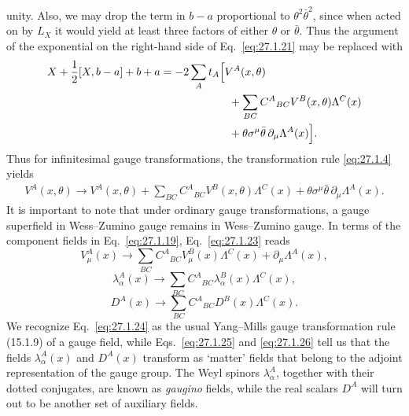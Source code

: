 unity. Also, we may drop the term in \(b-a\) proportional to
\(\theta^2\bar\theta^2\), since when acted on by \(L_X\) it would
yield at least three factors of either \(\theta\) or \(\bar\theta\). Thus
the argument of the exponential on the right-hand side of
Eq.~\eqref{eq:27.1.21} may be replaced with
\[
  \begin{aligned}
  X+\frac12[X,b-a]+b+a
  &=-2\sum_A t_A\Bigl[V^A(x,\theta)
  \\
  &\hspace{22mm}
    +\sum_{BC}C^A{}_{BC}V^B(x,\theta)\Lambda^C(x)
  \\
  &\hspace{22mm}
    +\theta\sigma^\mu\bar\theta\,
      \partial_\mu\Lambda^A(x)\Bigr].
  \end{aligned}
\]
Thus for infinitesimal gauge transformations, the transformation rule
\eqref{eq:27.1.4} yields
\begin{equation}
  \begin{split}
  V^A(x,\theta)\longrightarrow
  V^A(x,\theta)
  +\sum_{BC}C^A{}_{BC}V^B(x,\theta)\Lambda^C(x)
  +\theta\sigma^\mu\bar\theta\,\partial_\mu\Lambda^A(x).
  \end{split}
  \tag{27.1.23}\label{eq:27.1.23}
\end{equation}
It is important to note that under ordinary gauge transformations, a gauge
superfield in Wess--Zumino gauge remains in Wess--Zumino gauge. In terms of
the component fields in Eq.~\eqref{eq:27.1.19},
Eq.~\eqref{eq:27.1.23} reads
\begin{equation}
  V^A_\mu(x)\longrightarrow
  \sum_{BC}C^A{}_{BC}V^B_\mu(x)\Lambda^C(x)
  +\partial_\mu\Lambda^A(x),
  \tag{27.1.24}\label{eq:27.1.24}
\end{equation}
\begin{equation}
  \lambda^A_\alpha(x)\longrightarrow
  \sum_{BC}C^A{}_{BC}\lambda^B_\alpha(x)\Lambda^C(x),
  \tag{27.1.25}\label{eq:27.1.25}
\end{equation}
\begin{equation}
  D^A(x)\longrightarrow
  \sum_{BC}C^A{}_{BC}D^B(x)\Lambda^C(x).
  \tag{27.1.26}\label{eq:27.1.26}
\end{equation}
We recognize Eq.~\eqref{eq:27.1.24} as the usual Yang--Mills gauge
transformation rule (15.1.9) of a gauge field, while
Eqs.~\eqref{eq:27.1.25} and \eqref{eq:27.1.26} tell us that the fields
\(\lambda^A_\alpha(x)\) and \(D^A(x)\) transform as `matter' fields that
belong to the adjoint representation of the gauge group. The Weyl spinors
\(\lambda^A_\alpha\), together with their dotted conjugates, are known as
\textit{gaugino} fields, while the real scalars
\(D^A\) will turn out to be another set of auxiliary fields.

